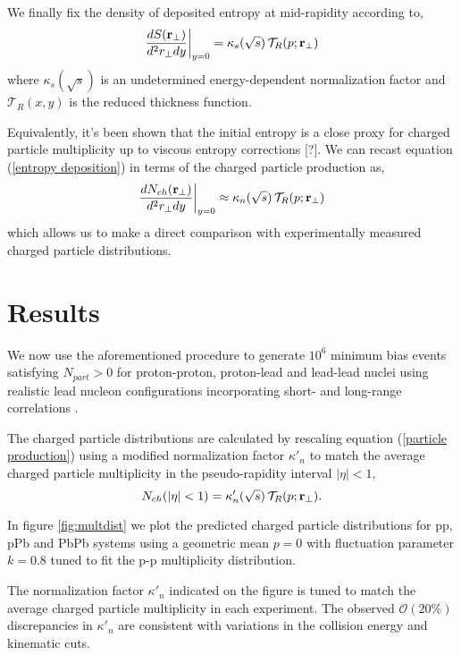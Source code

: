 \documentclass[aps,prl,reprint,amsmath,nofootinbib]{revtex4-1}
\begin{document}
We finally fix the density of deposited entropy at mid-rapidity according to,
\begin{equation}
 \label{entropy deposition}
 \frac{dS({\bf r}_\perp)}{d^2r_\perp dy} \biggr \rvert_{y=0} = \kappa_s(\sqrt{s})\, \mathcal{T}_R(p;{\bf r}_\perp)
\end{equation}
where $\kappa_s(\sqrt{s})$ is an undetermined energy-dependent normalization factor and $\mathcal{T}_R(x,y)$ is the reduced thickness function.

Equivalently, it's been shown that the initial entropy is a close proxy for charged particle multiplicity up to viscous entropy corrections [?]. We can 
recast equation (\ref{entropy deposition}) in terms of the charged particle production as,
\begin{equation}
 \label{particle production}
 \frac{dN_{ch}({\bf r}_\perp)}{d^2r_\perp dy} \biggr \rvert_{y=0} \approx \kappa_n(\sqrt{s})\, \mathcal{T}_R(p;{\bf r}_\perp)
\end{equation}
which allows us to make a direct comparison with experimentally measured charged particle distributions.

\section{Results}

We now use the aforementioned procedure to generate $10^6$ minimum bias events satisfying $N_{part} > 0$ for proton-proton, proton-lead and lead-lead nuclei using 
realistic lead nucleon configurations incorporating short- and long-range correlations \cite{nucleon-correlations}. 

The charged particle distributions are calculated by rescaling equation (\ref{particle production}) using a modified normalization factor $\kappa'_n$ to match the average charged particle 
multiplicity in the pseudo-rapidity interval $|\eta| < 1$,
\begin{equation}
 N_{ch}(|\eta|<1) = \kappa'_n(\sqrt{s})\, \mathcal{T}_R(p;{\bf r}_\perp).
\end{equation}

In figure \ref{fig:multdist} we plot the predicted charged particle distributions for pp, pPb and PbPb systems using a geometric mean $p=0$ with fluctuation parameter $k=0.8$ tuned 
to fit the p-p multiplicity distribution. 

The normalization factor $\kappa'_n$ indicated on the figure is tuned to match the average charged particle multiplicity in each experiment. The observed
$\mathcal{O}(20\%)$ discrepancies in $\kappa'_n$ are consistent with variations in the collision energy and kinematic cuts.
\end{document}
